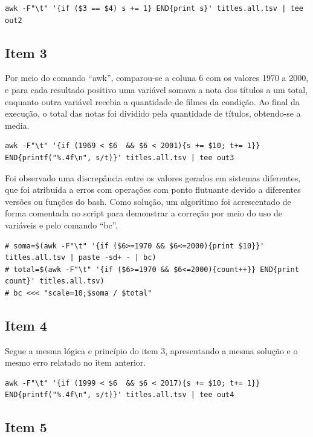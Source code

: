\documentclass[12pt]{article}
\begin{document}
\begin{verbatim}
awk -F"\t" '{if ($3 == $4) s += 1} END{print s}' titles.all.tsv | tee out2
\end{verbatim}

\subsection*{Item 3}

Por meio do comando ``awk'', comparou-se a coluna 6 com os valores 1970 a 2000, e para cada resultado positivo uma variável somava a nota dos títulos a um total, enquanto outra variável recebia a quantidade de filmes da condição. Ao final da execução, o total das notas foi dividido pela quantidade de títulos, obtendo-se a media.

\begin{verbatim}
awk -F"\t" '{if (1969 < $6  && $6 < 2001){s += $10; t+= 1}} END{printf("%.4f\n", s/t)}' titles.all.tsv | tee out3
\end{verbatim}

Foi observado uma discrepância entre os valores gerados em sistemas diferentes, que foi atribuída a erros com operações com ponto flutuante devido a diferentes versões ou funções do bash. Como solução, um algorítimo foi acrescentado de forma comentada no script para demonstrar a correção por meio do uso de variáveis e pelo comando ``bc''.

\begin{verbatim}
# soma=$(awk -F"\t" '{if ($6>=1970 && $6<=2000){print $10}}' titles.all.tsv | paste -sd+ - | bc) 
# total=$(awk -F"\t" '{if ($6>=1970 && $6<=2000){count++}} END{print count}' titles.all.tsv)
# bc <<< "scale=10;$soma / $total"
\end{verbatim}

\subsection*{Item 4}

Segue a mesma lógica e princípio do item 3, apresentando a mesma solução e o mesmo erro relatado no item anterior.

\begin{verbatim}
awk -F"\t" '{if (1999 < $6  && $6 < 2017){s += $10; t+= 1}} END{printf("%.4f\n", s/t)}' titles.all.tsv | tee out4
\end{verbatim}

\subsection*{Item 5}
\end{document}
